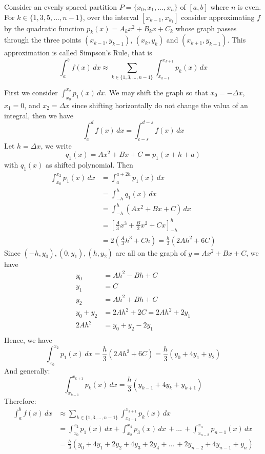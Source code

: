 \documentclass[12pt]{article}
\begin{document}
\noindent
Consider an evenly spaced partition $P = \{x_0, x_1, ..., x_n \}$ of $[a, b]$ where $n$ is even. For $k \in \{1,3,5,..., n-1\}$, over the interval $[x_{k - 1}, x_{k _ 1}]$ consider approximating $f$
by the quadratic function $p_k(x) = A_kx^2 + B_kx + C_k$ whose graph passes through the three points $(x_{k-1}, y_{k - 1})$, $(x_k, y_k)$ and $(x_{k+1}, y_{k + 1})$.
This approximation is called Simpson's Rule, that is
\[
    \int_a^b f(x) \, dx \approx \sum_{k \in \{1,3, \dots, n - 1 \}} \int_{x_{k - 1}}^{x_{k + 1}} p_k(x) \, dx
\]

First we consider $\int_{x_0}^{x_2} p_1 (x) \, dx$. We may shift the graph so that $x_0 = -\Delta x$, $x_1 = 0$, and $x_2 = \Delta x$ since shifting horizontally do not change
the valua of an integral, then we have 
\[
    \int_c^d f(x) \, dx = \int_{c - s}^{d - s} f(x) \, dx
\]
Let $h = \Delta x$, we write 
\[
    q_1(x) = Ax^2 + Bx + C = p_1(x + h + a)
\]
with $q_1(x)$ as shifted polynomial. Then 
\begin{align*} 
    \int_{x_0}^{x_2} p_1 (x) \, dx &= \int_a^{a + 2h} p_1(x) \, dx\, \\
    &= \int_{ - h}^{h} q_1(x) \, dx\, \\
    &= \int_{ - h}^{h} (Ax^2 + Bx + C) \, dx \\
    &= \left[\frac{A}{3}x^3 + \frac{B}{2}x^2 + Cx \right]^{h}_{ - h} \\
    &= 2\left(\frac{A}{3}h^3 + Ch \right) = \frac{h}{3} (2Ah^2 + 6C)
\end{align*}
Since $(-h, y_0), (0, y_1), (h, y_2)$ are all on the graph of $y = Ax^2 + Bx + C$, we have
\begin{align*} 
    y_0 &= Ah^2 - Bh + C \\
    y_1 &= C \\
    y_2 &= Ah^2 + Bh + C \\
    y_0 + y_2 &= 2Ah^2 + 2C = 2Ah^2 + 2y_1 \\
    2Ah^2 &= y_0 + y_2 - 2y_1 \\
\end{align*}
Hence, we have 
\[
    \int_{x_0}^{x_2} p_1(x) \, dx = \frac{h}{3} (2Ah^2 + 6C) = \frac{h}{3} (y_0 + 4y_1 + y_2)
\]
And generally:
\[
    \int_{x_{k - 1}}^{x_{k + 1}} p_k(x) \, dx = \frac{h}{3} (y_{k - 1} + 4y_{k} + y_{k + 1})
\]
Therefore:
\begin{align*} 
    \int_a^b f(x) \, dx &\approx \sum_{k \in \{1,3, \dots, n - 1 \} } \int_{x_{k - 1}}^{x_{k + 1}} p_k(x) \, dx\, \\
    &= \int_{x_0}^{x_2} p_1(x) \, dx + \int_{x_2}^{x_4} p_3(x) \, dx\, + \dots\, + \int_{x_{n - 2}}^{x_n} p_{n - 1}(x) \, dx\, \\
    &= \frac{h}{3} (y_0 + 4y_1 + 2y_2 + 4y_3 + 2y_4 + \dots\, + 2y_{n - 2} + 4y_{n - 1} + y_n)
\end{align*}
    
\end{document}
